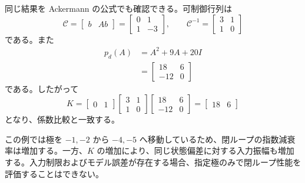 同じ結果を Ackermann の公式でも確認できる。可制御行列は
\begin{equation}
  \mathcal{C}=\begin{bmatrix}b&Ab\end{bmatrix}
  =\begin{bmatrix}0&1\\1&-3\end{bmatrix},\qquad
  \mathcal{C}^{-1}=\begin{bmatrix}3&1\\1&0\end{bmatrix}
\end{equation}
である。また
\begin{align}
  p_d(A)&=A^2+9A+20I\\
  &=\begin{bmatrix}18&6\\-12&0\end{bmatrix}
\end{align}
である。したがって
\begin{equation}
  K=\begin{bmatrix}0&1\end{bmatrix}
    \begin{bmatrix}3&1\\1&0\end{bmatrix}
    \begin{bmatrix}18&6\\-12&0\end{bmatrix}
   =\begin{bmatrix}18&6\end{bmatrix}
\end{equation}
となり、係数比較と一致する。

この例では極を $-1,-2$ から $-4,-5$ へ移動しているため、閉ループの指数減衰率は増加する。一方、$K$ の増加により、同じ状態偏差に対する入力振幅も増加する。入力制限およびモデル誤差が存在する場合、指定極のみで閉ループ性能を評価することはできない。
